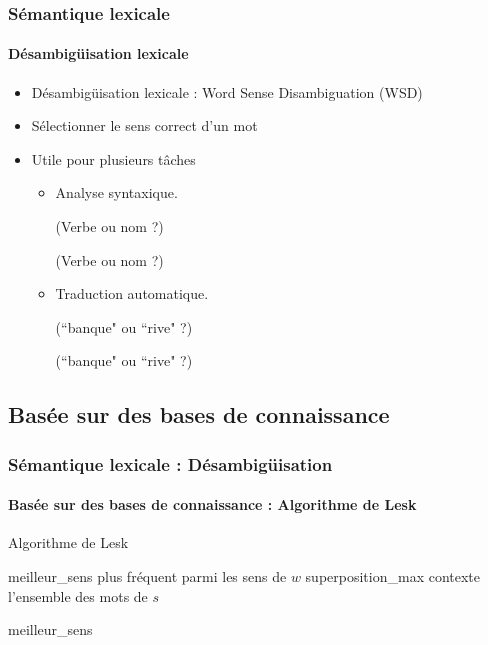 \documentclass[xcolor=table]{beamer}
\begin{document}
\begin{frame}
\frametitle{Sémantique lexicale}
\framesubtitle{Désambigüisation lexicale}

\begin{itemize}
	\item Désambigüisation lexicale : Word Sense Disambiguation (WSD)
	\item Sélectionner le sens correct d'un mot 
	\item Utile pour plusieurs tâches 
	\begin{itemize}
		\item Analyse syntaxique. 
		
		 (Verbe ou nom ?)
		
		 (Verbe ou nom ?)
		
		\item Traduction automatique. 
		
		 (``banque" ou ``rive" ?)
		
		 (``banque" ou ``rive" ?)
	\end{itemize}
\end{itemize}

\end{frame}

\subsection{Basée sur des bases de connaissance}

\begin{frame}
\frametitle{Sémantique lexicale : Désambigüisation}
\framesubtitle{Basée sur des bases de connaissance : Algorithme de Lesk}

\vspace{-6pt}
\begin{block}{Algorithme de Lesk}
	\footnotesize\vspace{-3pt}
	\begin{algorithm}[H]
		
		meilleur\_sens \textleftarrow plus fréquent parmi les sens de $w$\;
		superposition\_max \;
		contexte \textleftarrow l'ensemble des mots de $s$\; 
		
		
		\Retour meilleur\_sens \;
		\vspace{-3pt}
	\end{algorithm}
\end{block}

\end{frame}
\end{document}
